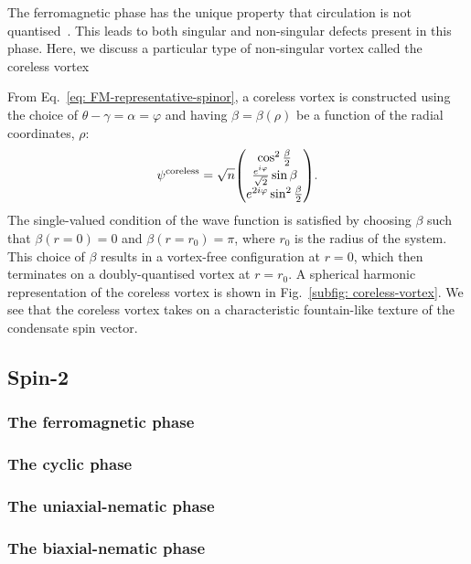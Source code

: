 The ferromagnetic phase has the unique property that circulation is not
quantised~\cite{Kawaguchi2012}.
This leads to both singular and non-singular defects present in this phase.
Here, we discuss a particular type of non-singular vortex called the coreless
vortex~\cite{Martikainen2002, Leanhardt2003}

From Eq.~\eqref{eq: FM-representative-spinor}, a coreless vortex is constructed
using the choice of \(\theta-\gamma = \alpha= \varphi \) and having
\(\beta = \beta(\rho)\) be a function of the radial coordinates, \(\rho \):
\begin{equation}
    \psi^\mathrm{coreless} = \sqrt{n}\mqty(
        \cos^2\frac{\beta}{2} \\
        \frac{e^{i\varphi}}{\sqrt{2}}\sin\beta \\
        e^{2i\varphi}\sin^2\frac{\beta}{2}
    ).
\end{equation}
The single-valued condition of the wave function is satisfied by choosing
\(\beta \) such that \(\beta(r=0) = 0\) and \(\beta(r=r_0) = \pi \), where
\(r_0\) is the radius of the system.
This choice of \(\beta \) results in a vortex-free configuration at \(r=0\),
which then terminates on a doubly-quantised vortex at \(r=r_0\).
A spherical harmonic representation of the coreless vortex is shown in
Fig.~\ref{subfig: coreless-vortex}.
We see that the coreless vortex takes on a characteristic fountain-like texture
of the condensate spin vector.

\subsection{Spin-2}

\subsubsection{The ferromagnetic phase}
\subsubsection{The cyclic phase}
\subsubsection{The uniaxial-nematic phase}
\subsubsection{The biaxial-nematic phase}
